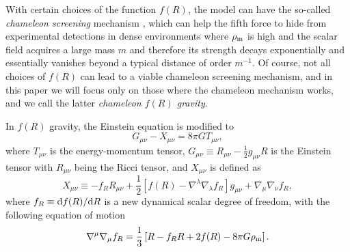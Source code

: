 With certain choices of the function $f(R)$, the model can have the so-called \textit{chameleon screening} mechanism \cite{Khoury:2003aq,Khoury:2003rn,Mota:2006fz,Brax:2008hh}, which can help the fifth force to hide from experimental detections in dense environments where $\rho_{\rm m}$ is high and the scalar field acquires a large mass $m$ and therefore its strength decays exponentially and essentially vanishes beyond a typical distance of order $m^{-1}$. Of course, not all choices of $f(R)$ can lead to a viable chameleon screening mechanism, and in this paper we will focus only on those where the chameleon mechanism works, and we call the latter \textit{chameleon $f(R)$ gravity}. 

In $f(R)$ gravity, the Einstein equation is modified to
\begin{equation}\label{eq:fR_modified_einstein_eqn}
    G_{\mu\nu} - X_{\mu\nu} = 8\pi{G}T_{\mu\nu},
\end{equation}
where $T_{\mu\nu}$ is the energy-momentum tensor, $G_{\mu\nu}\equiv{R}_{\mu\nu}-\frac{1}{2}g_{\mu\nu}R$ is the Einstein tensor with $R_{\mu\nu}$ being the Ricci tensor, and $X_{\mu\nu}$ is defined as
\begin{equation}\label{eq:Xmn}
    X_{\mu\nu} \equiv -f_RR_{\mu\nu} + \frac{1}{2}\left[f(R)-\nabla^\lambda\nabla_\lambda f_R\right]g_{\mu\nu} + \nabla_\mu\nabla_\nu f_R,
\end{equation}
where $f_R\equiv{\rm d}f(R)/{\rm d}R$ is a new dynamical scalar degree of freedom, with the following equation of motion
\begin{equation}\label{eq:fR_eom}
    \nabla^\mu\nabla_\mu{f}_R = \frac{1}{3}\left[R-f_RR+2f(R)-8\pi{G}\rho_{\rm m}\right].
\end{equation}

